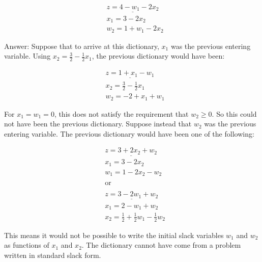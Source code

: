 \documentclass{article}
\begin{document}
\begin{enumerate}
\begin{align*}
&\underline{z = 4 - w_1 - 2x_2} \\
&x_1 = 3 - 2x_2 \\
&w_2 = 1 + w_1 -2x_2
\end{align*}

Answer: Suppose that to arrive at this dictionary, $x_1$ was the previous entering variable. Using $x_2 = \frac{3}{2} - \frac{1}{2}x_1$, the previous dictionary would have been:

\begin{align*}
&\underline{z = 1 + x_1 - w_1} \\
&x_2 = \frac{3}{2} - \frac{1}{2}x_1 \\
&w_2 = -2 + x_1 + w_1
\end{align*}

For $x_1 = w_1 = 0$, this does not satisfy the requirement that $w_2 \geq 0$. So this could not have been the previous dictionary. Suppose instead that $w_2$ was the previous entering variable. The previous dictionary would have been one of the following:

\begin{align*}
&\underline{z = 3 + 2x_2 + w_2} \\
&x_1 = 3-2x_2 \\
&w_1 = 1 - 2x_2 - w_2 \\
&\\
&\text{or}\\
&\\
&\underline{z = 3 - 2w_1 + w_2} \\
&x_1 = 2 - w_1 + w_2 \\
&x_2 = \frac{1}{2} + \frac{1}{2}w_1 - \frac{1}{2}w_2
\end{align*}

This means it would not be possible to write the initial slack variables $w_1$ and $w_2$ as functions of $x_1$ and $x_2$.  The dictionary cannot have come from a problem written in standard slack form. 



\end{enumerate}
\end{document}
